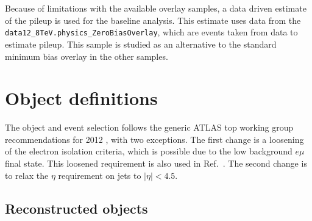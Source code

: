 Because of limitations with the available overlay samples, a data driven estimate of the pileup is used for the baseline
analysis.  This estimate uses 
data from the \texttt{ data12\_8TeV.physics\_ZeroBiasOverlay}, which are events taken from data to estimate pileup.  This sample is studied as an alternative to the standard minimum bias overlay in the other samples.
\section{Object definitions}
The object and event selection follows the generic ATLAS top working
group recommendations for 2012 \cite{topreco}, with two exceptions. The first change is a loosening of the electron isolation criteria, which is possible due to the low background  $e\mu$ final state. This loosened requirement is also used in Ref.~\cite{xsec}. The second change is to relax the $\eta$ requirement on  jets to $|\eta|<4.5$.

\subsection{Reconstructed objects}\label{s:objects}

